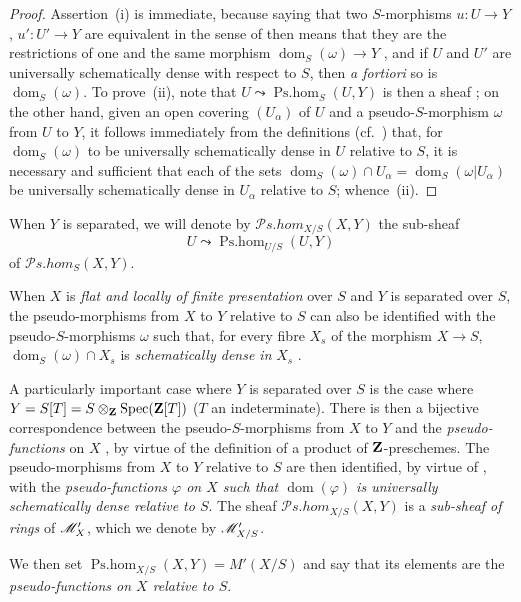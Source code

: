 \begin{proof}
Assertion~(i) is immediate, because saying that two $S$-morphisms $u:U\to Y$, $u':U'\to Y$ are equivalent in the sense of  then means that they are the restrictions of one and the same morphism $\operatorname{dom}_S(\omega)\to Y$ , and if $U$ and $U'$ are universally schematically dense with respect to $S$, then \emph{a fortiori} so is $\operatorname{dom}_S(\omega)$.
To prove~(ii), note that $U\leadsto\operatorname{Ps.hom}_S(U,Y)$ is then a sheaf ; on the other hand, given an open covering $(U_\alpha)$ of $U$ and a pseudo-$S$-morphism $\omega$ from $U$ to $Y$, it follows immediately from the definitions (cf.\ ) that, for $\operatorname{dom}_S(\omega)$ to be universally schematically dense in $U$ relative to $S$, it is necessary and sufficient that each of the sets $\operatorname{dom}_S(\omega)\cap U_\alpha=\operatorname{dom}_S(\omega|U_\alpha)$ be universally schematically dense in $U_\alpha$ relative to $S$; whence~(ii).
\end{proof}

When $Y$ is separated, we will denote by $\mathscr{P}\!s.\mathit{hom}_{X/S}(X,Y)$ the sub-sheaf
\[
  U\leadsto\operatorname{Ps.hom}_{U/S}(U,Y)
\]
of $\mathscr{P}\!s.\mathit{hom}_S(X,Y)$.

When $X$ is \emph{flat and locally of finite presentation} over $S$ and $Y$ is separated over $S$, the pseudo-morphisms from $X$ to $Y$ relative to $S$ can also be identified with the pseudo-$S$-morphisms $\omega$ such that, for every fibre $X_s$ of the morphism $X\to S$, $\operatorname{dom}_S(\omega)\cap X_s$ is \emph{schematically dense in} $X_s$ .

\begin{env}[20.5.4]\label{IV.20.5.4}
A particularly important case where $Y$ is separated over $S$ is the case where $Y=S[T]=S\otimes_{\mathbf{Z}}\operatorname{Spec}(\mathbf{Z}[T])$ ($T$ an indeterminate).
There is then a bijective correspondence between the pseudo-$S$-morphisms from $X$ to $Y$ and the \emph{pseudo-functions} on $X$ , by virtue of the definition of a product of $\mathbf{Z}$-preschemes.
The pseudo-morphisms from $X$ to $Y$ relative to $S$ are then identified, by virtue of , with the \emph{pseudo-functions $\varphi$ on $X$ such that $\operatorname{dom}(\varphi)$ is universally schematically dense relative to $S$}.
The sheaf $\mathscr{P}\!s.\mathit{hom}_{X/S}(X,Y)$ is a \emph{sub-sheaf of rings} of $\mathscr{M}'_X$, which we denote by $\mathscr{M}'_{X/S}$.

We then set $\operatorname{Ps.hom}_{X/S}(X,Y)=M'(X/S)$ and say that its elements are the \emph{pseudo-functions on $X$ relative to $S$}.
\end{env}

